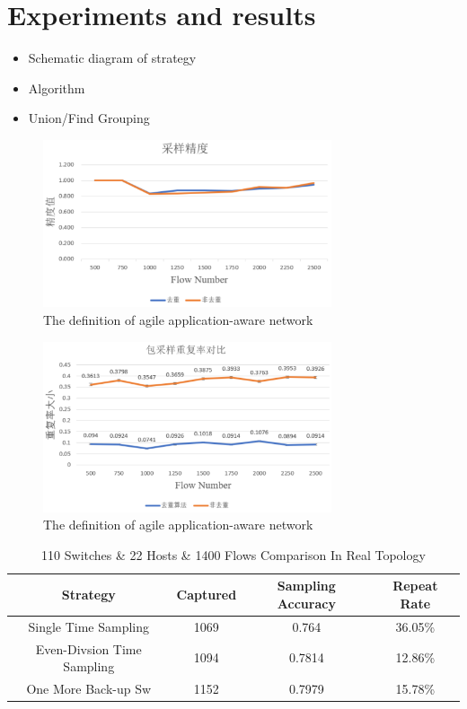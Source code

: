 \documentclass[conference,compsoc]{IEEEtran}
\begin{document}
\section{Experiments and results}

 

\begin{itemize}
\item Schematic diagram of strategy
\item Algorithm
\item Union/Find Grouping

\end{itemize}


\begin{figure}[!hhhhhhhhhht]
\centering
\includegraphics[width=8.50cm]{images/compare.png}
\caption{The definition of agile application-aware network}
\label{aaa.png}
\end{figure}


\begin{figure}[!hhhhhhhhhht]
\centering
\includegraphics[width=8.50cm]{images/compare2.png}
\caption{The definition of agile application-aware network}
\label{aaa.png}
\end{figure}




\begin{table}[]
\centering
\caption{110 Switches \& 22 Hosts \&  1400 Flows Comparison In Real Topology }
\begin{tabular}{|c|c|c|c|}  %

\hline 
Strategy & Captured  &Sampling Accuracy& Repeat Rate\\
\hline 
Single Time Sampling &  1069 &0.764 & 36.05\%\\
\hline  

Even-Divsion Time Sampling&1094 & 0.7814 & 12.86\%\\
\hline
One More Back-up Sw & 1152 & 0.7979 & 15.78\%\\

\hline 
\end{tabular}
\end{table}
\end{document}
